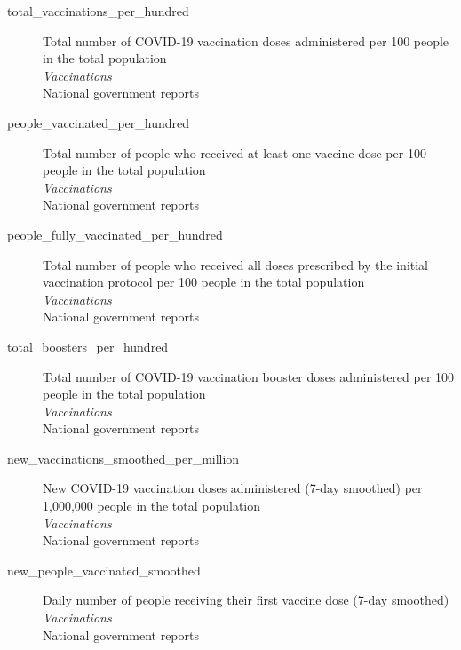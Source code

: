 \begin{description}
    \item[total\_vaccinations\_per\_hundred] 
    Total number of COVID-19 vaccination doses administered per 100 people in the total population\\
    \emph{\footnotesize{Vaccinations}}\\
    \footnotesize{National government reports}\\

    \item[people\_vaccinated\_per\_hundred] 
    Total number of people who received at least one vaccine dose per 100 people in the total population\\
    \emph{\footnotesize{Vaccinations}}\\
    \footnotesize{National government reports}\\

    \item[people\_fully\_vaccinated\_per\_hundred] 
    Total number of people who received all doses prescribed by the initial vaccination protocol per 100 people in the total population\\
    \emph{\footnotesize{Vaccinations}}\\
    \footnotesize{National government reports}\\

    \item[total\_boosters\_per\_hundred] 
    Total number of COVID-19 vaccination booster doses administered per 100 people in the total population\\
    \emph{\footnotesize{Vaccinations}}\\
    \footnotesize{National government reports}\\

    \item[new\_vaccinations\_smoothed\_per\_million] 
    New COVID-19 vaccination doses administered (7-day smoothed) per 1,000,000 people in the total population\\
    \emph{\footnotesize{Vaccinations}}\\
    \footnotesize{National government reports}\\

    \item[new\_people\_vaccinated\_smoothed] 
    Daily number of people receiving their first vaccine dose (7-day smoothed)\\
    \emph{\footnotesize{Vaccinations}}\\
    \footnotesize{National government reports}\\


\end{description}
